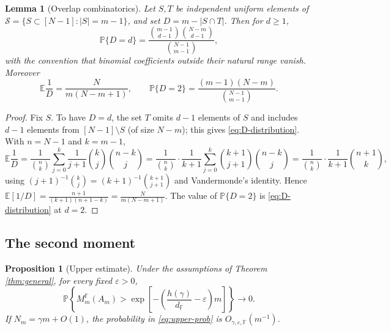 \documentclass[10pt,a4paper]{amsart}
\newtheorem{proposition}[theorem]{Proposition}
\newtheorem{lemma}[theorem]{Lemma}
\newcommand{\F}{\mathbb{F}}
\newcommand{\PP}{\mathbb{P}}
\newcommand{\EE}{\mathbb{E}}
\newcommand{\cS}{\mathcal{S}}
\begin{document}
\begin{lemma}[Overlap combinatorics]\label{lem:overlap}
Let $S,T$ be independent uniform elements of $\cS=\{S\subset[N-1]: |S|=m-1\}$, and set $D=m-|S\cap T|$.
Then for $d\ge1$,
\begin{equation}\label{eq:D-distribution}
  \PP\{D=d\}=\frac{\binom{m-1}{d-1}\binom{N-m}{d-1}}{\binom{N-1}{m-1}},
\end{equation}
with the convention that binomial coefficients outside their natural range vanish. Moreover
\begin{equation}\label{eq:EDinv}
  \EE\frac1D=\frac{N}{m(N-m+1)},
  \qquad
  \PP\{D=2\}=\frac{(m-1)(N-m)}{\binom{N-1}{m-1}}.
\end{equation}
\end{lemma}

\begin{proof}
Fix $S$. To have $D=d$, the set $T$ omits $d-1$ elements of $S$ and includes $d-1$ elements from
$[N-1]\setminus S$ (of size $N-m$); this gives \eqref{eq:D-distribution}. With $n=N-1$ and $k=m-1$,
\[
  \EE\frac1D=\frac1{\binom nk}\sum_{j=0}^k\frac1{j+1}\binom kj\binom{n-k}{j}
  =\frac1{\binom nk}\cdot\frac1{k+1}\sum_{j=0}^k\binom{k+1}{j+1}\binom{n-k}{j}
  =\frac{1}{\binom nk}\cdot\frac{1}{k+1}\binom{n+1}{k},
\]
using $(j+1)^{-1}\binom kj=(k+1)^{-1}\binom{k+1}{j+1}$ and Vandermonde's identity. Hence
$\EE[1/D]=\frac{n+1}{(k+1)(n+1-k)}=\frac{N}{m(N-m+1)}$. The value of $\PP\{D=2\}$ is
\eqref{eq:D-distribution} at $d=2$.
\end{proof}

\subsection{The second moment}

\begin{proposition}[Upper estimate]\label{prop:upper}
Under the assumptions of Theorem \ref{thm:general}, for every fixed $\varepsilon>0$,
\begin{equation}\label{eq:upper-prob}
  \PP\left\{M_m^\F(A_m)>\exp\left[-\left(\frac{h(\gamma)}{d_\F}-\varepsilon\right)m\right]\right\}\to0.
\end{equation}
If $N_m=\gamma m+O(1)$, the probability in \eqref{eq:upper-prob} is $O_{\gamma,\varepsilon,\F}(m^{-1})$.
\end{proposition}
\end{document}
